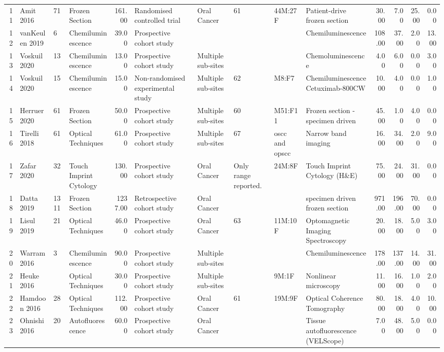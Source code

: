 \begin{table}[ht]
\begin{tabular}{rlllrlllllrrrr}
  11 & Amit 2016 & 71 & Frozen Section & 161.00 & Randomised controlled trial & Oral Cancer & 61 & 44M:27F & Patient-drive frozen section & 30.00 & 7.00 & 25.00 & 0.00 \\ 
  12 & vanKeulen 2019 & 6 & Chemiluminescence & 39.00 & Prospective cohort study &  &  &  & Chemiluminescence & 108.00 & 37.00 & 2.00 & 13.00 \\ 
  13 & Voskuil 2020 & 13 & Chemiluminescence & 13.00 & Prospective cohort study & Multiple sub-sites &  &  & Chemoluminescence & 4.00 & 6.00 & 0.00 & 3.00 \\ 
  14 & Voskuil 2020 & 15 & Chemiluminescence & 15.00 & Non-randomised experimental study & Multiple sub-sites & 62 & M8:F7 & Chemiluminescence Cetuximab-800CW & 10.00 & 4.00 & 0.00 & 1.00 \\ 
  15 & Herruer 2020 & 61 & Frozen Section & 50.00 & Prospective cohort study & Multiple sub-sites & 60 & M51:F11 & Frozen section - specimen driven & 45.00 & 1.00 & 4.00 & 0.00 \\ 
  16 & Tirelli 2018 & 61 & Optical Techniques & 61.00 & Prospective cohort study & Multiple sub-sites & 67 & oscc and opscc & Narrow band imaging & 16.00 & 34.00 & 2.00 & 9.00 \\ 
  17 & Zafar 2020 & 32 & Touch Imprint Cytology & 130.00 & Prospective cohort study & Oral Cancer & Only range reported. & 24M:8F & Touch Imprint Cytology (H\&E) & 75.00 & 24.00 & 31.00 & 0.00 \\ 
  18 & Datta 2019 & 1311 & Frozen Section & 1237.00 & Retrospective cohort study & Oral Cancer &  &  & specimen driven frozen section & 971.00 & 196.00 & 70.00 & 0.00 \\ 
  19 & Lisul 2019 & 21 & Optical Techniques & 46.00 & Prospective cohort study & Oral Cancer & 63 & 11M:10F & Optomagnetic Imaging Spectroscopy & 20.00 & 18.00 & 5.00 & 3.00 \\ 
  20 & Warram 2016 & 3 & Chemiluminescence & 90.00 & Prospective cohort study & Multiple sub-sites &  &  & Chemiluminescence & 178.00 & 137.00 & 14.00 & 31.00 \\ 
  21 & Heuke 2016 &  & Optical Techniques & 30.00 & Prospective cohort study & Multiple sub-sites &  & 9M:1F & Nonlinear microscopy & 11.00 & 16.00 & 1.00 & 2.00 \\ 
  22 & Hamdoon 2016 & 28 & Optical Techniques & 112.00 & Prospective cohort study & Oral Cancer & 61 & 19M:9F & Optical Coherence Tomography & 80.00 & 18.00 & 4.00 & 10.00 \\ 
  23 & Ohnishi 2016 & 20 & Autofluorescence & 60.00 & Prospective cohort study & Oral Cancer &  &  & Tissue autofluorescence (VELScope) & 7.00 & 48.00 & 5.00 & 0.00 \\ 

\end{tabular}
\end{table}
